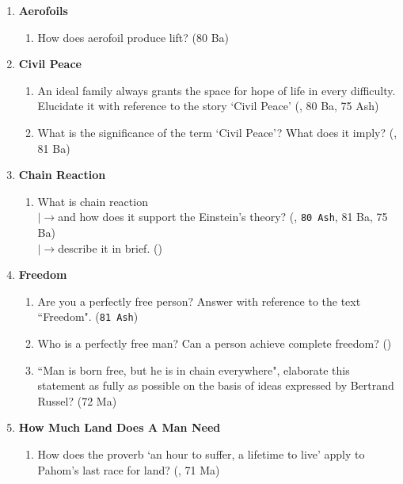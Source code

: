 \documentclass[12pt]{article}
\newcommand{\lb}{\\$\left|\rightarrow\right.$}
\begin{document}
  \begin{enumerate}
    \item \textbf{Aerofoils}
      \begin{enumerate}[noitemsep, topsep=0pt]
        \item How does aerofoil produce lift? \hfill (80 Ba)
      \end{enumerate}

    \item \textbf{Civil Peace}
      \begin{enumerate}
        \item An ideal family always grants the space for hope of life in every difficulty. Elucidate it with reference to the story `Civil Peace' \hfill (, 80 Ba, 75 Ash)

        \item What is the significance of the term `Civil Peace'? What does it imply? \hfill (, 81 Ba)
      \end{enumerate}

    \item \textbf{Chain Reaction}
      \begin{enumerate}[noitemsep, topsep=0pt]
        \item What is chain reaction
          \lb and how does it support the Einstein's theory? \hfill (, \texttt{80 Ash}, 81 Ba, 75 Ba)
          \lb describe it in brief. \hfill ()
      \end{enumerate}

    \item \textbf{Freedom}
      \begin{enumerate}
        \item Are you a perfectly free person? Answer with reference to the text ``Freedom". \hfill (\texttt{81 Ash})

        \item Who is a perfectly free man? Can a person achieve complete freedom? \hfill ()

        \item ``Man is born free, but he is in chain everywhere", elaborate this statement as fully as possible on the basis of ideas expressed by Bertrand Russel? \hfill (72 Ma)
      \end{enumerate}

    \item \textbf{How Much Land Does A Man Need}
      \begin{enumerate}
        \item How does the proverb `an hour to suffer, a lifetime to live' apply to Pahom's last race for land? \hfill (, 71 Ma)


\end{enumerate}
\end{enumerate}
\end{document}

